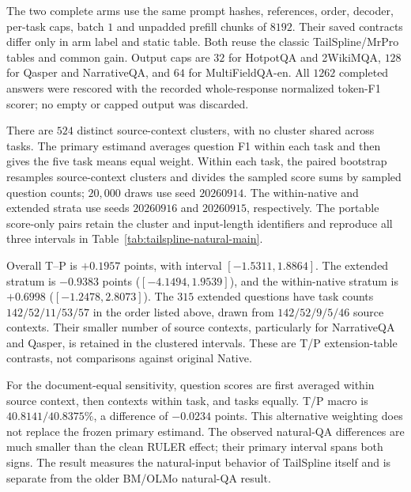 The two complete arms use the same prompt hashes, references, order, decoder,
per-task caps, batch $1$ and unpadded prefill chunks of $8192$. Their saved
contracts differ only in arm label and static table. Both reuse the classic
TailSpline/MrPro tables and common gain. Output caps are $32$ for HotpotQA and
2WikiMQA, $128$ for Qasper and NarrativeQA, and $64$ for MultiFieldQA-en.
All $1262$ completed answers were rescored with the recorded whole-response
normalized token-F1 scorer; no empty or capped output was discarded.

There are $524$ distinct source-context clusters, with no cluster shared across
tasks. The primary estimand averages question F1 within each task and then gives
the five task means equal weight. Within each task, the paired bootstrap
resamples source-context clusters and divides the sampled score sums by sampled
question counts; $20{,}000$ draws use seed $20260914$. The within-native and
extended strata use seeds $20260916$ and $20260915$, respectively. The portable
score-only pairs retain the cluster and input-length identifiers and reproduce
all three intervals in Table~\ref{tab:tailspline-natural-main}.




Overall T--P is $+0.1957$ points, with interval $[-1.5311,1.8864]$.
The extended stratum is $-0.9383$ points ($[-4.1494,1.9539]$), and the within-native
stratum is $+0.6998$ ($[-1.2478,2.8073]$). The $315$ extended questions have task
counts $142/52/11/53/57$ in the order listed above, drawn from
$142/52/9/5/46$ source contexts. Their smaller number of source contexts,
particularly for NarrativeQA and Qasper, is retained in the clustered intervals.
These are T/P extension-table contrasts, not comparisons against original Native.

For the document-equal sensitivity, question scores are first averaged within
source context, then contexts within task, and tasks equally. T/P macro is
$40.8141/40.8375\%$, a difference of $-0.0234$ points. This alternative weighting
does not replace the frozen primary estimand. The observed natural-QA differences
are much smaller than the clean RULER effect; their primary interval spans both
signs. The result measures the natural-input behavior of TailSpline itself and
is separate from the older BM/OLMo natural-QA result.


